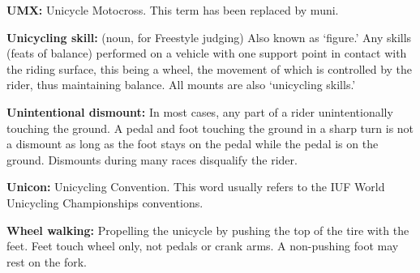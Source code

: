 \textbf{UMX:} Unicycle Motocross.
This term has been replaced by muni.

\textbf{Unicycling skill:} (noun, for Freestyle judging) Also known as `figure.' Any skills (feats of balance) performed on a vehicle with one support point in contact with the riding surface, this being a wheel, the movement of which is controlled by the rider, thus maintaining balance.
All mounts are also `unicycling skills.' 

\textbf{Unintentional dismount:} In most cases, any part of a rider unintentionally touching the ground.
A pedal and foot touching the ground in a sharp turn is not a dismount as long as the foot stays on the pedal while the pedal is on the ground.
Dismounts during many races disqualify the rider.

\textbf{Unicon:} Unicycling Convention.
This word usually refers to the IUF World Unicycling Championships conventions.

\textbf{Wheel walking:} Propelling the unicycle by pushing the top of the tire with the feet.
Feet touch wheel only, not pedals or crank arms.
A non-pushing foot may rest on the fork.
